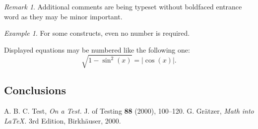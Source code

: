 \documentclass{birkjour}
\theoremstyle{definition}
\theoremstyle{remark}
\newtheorem{rem}[thm]{Remark}
\newtheorem*{ex}{Example}
\numberwithin{equation}{section}
\begin{document}
\begin{rem}
Additional comments are being typeset without boldfaced entrance
word as they may be minor important.
\end{rem}

\begin{ex}
For some constructs, even no number is required.
\end{ex}

Displayed equations may be numbered like the following one:
\begin{equation}
\sqrt{1-\sin^2(x)}=|\cos(x)|.
\end{equation}


\subsection{Conclusions}



\begin{thebibliography}{1}
 A. B. C. Test, \textit{On a Test.} J. of Testing
\textbf{88} (2000), 100--120.
 G. Gr\"atzer, \textit{Math into \LaTeX.} 3rd Edition,
Birkh\"auser, 2000.
\end{thebibliography}

\end{document}
